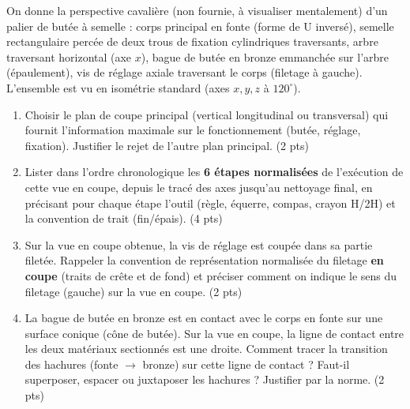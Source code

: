 \documentclass[11pt]{article}
\begin{document}
\begin{exercice}
On donne la perspective cavalière (non fournie, à visualiser mentalement) d'un palier de butée à semelle : corps principal en fonte (forme de U inversé), semelle rectangulaire percée de deux trous de fixation cylindriques traversants, arbre traversant horizontal (axe $x$), bague de butée en bronze emmanchée sur l'arbre (épaulement), vis de réglage axiale traversant le corps (filetage à gauche). L'ensemble est vu en isométrie standard (axes $x, y, z$ à $120^\circ$).
\begin{enumerate}
    \item Choisir le plan de coupe principal (vertical longitudinal ou transversal) qui fournit l'information maximale sur le fonctionnement (butée, réglage, fixation). Justifier le rejet de l'autre plan principal. (2 pts)
    \item Lister dans l'ordre chronologique les \textbf{6 étapes normalisées} de l'exécution de cette vue en coupe, depuis le tracé des axes jusqu'au nettoyage final, en précisant pour chaque étape l'outil (règle, équerre, compas, crayon H/2H) et la convention de trait (fin/épais). (4 pts)
    \item Sur la vue en coupe obtenue, la vis de réglage est coupée dans sa partie filetée. Rappeler la convention de représentation normalisée du filetage \textbf{en coupe} (traits de crête et de fond) et préciser comment on indique le sens du filetage (gauche) sur la vue en coupe. (2 pts)
    \item La bague de butée en bronze est en contact avec le corps en fonte sur une surface conique (cône de butée). Sur la vue en coupe, la ligne de contact entre les deux matériaux sectionnés est une droite. Comment tracer la transition des hachures (fonte $\to$ bronze) sur cette ligne de contact ? Faut-il superposer, espacer ou juxtaposer les hachures ? Justifier par la norme. (2 pts)
\end{enumerate}
\end{exercice}
\end{document}
